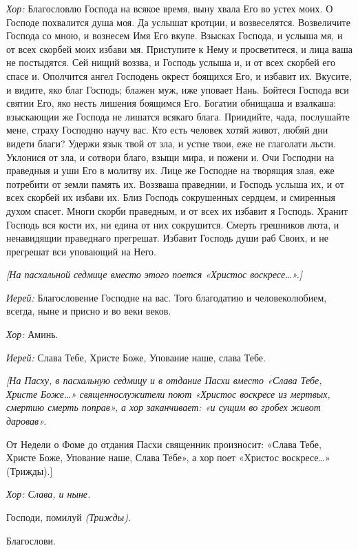 \begin{mymulticols}
{\itshape Хор:} Благословлю Господа на всякое время, выну хвала Его во устех моих. О Господе похвалится душа моя. Да услышат кротции, и возвеселятся. Возвеличите Господа со мною, и вознесем Имя Его вкупе. Взысках Господа, и услыша мя, и от всех скорбей моих избави мя. Приступите к Нему и просветитеся, и лица ваша не постыдятся. Сей нищий воззва, и Господь услыша и, и от всех скорбей его спасе и. Ополчится ангел Господень окрест боящихся Его, и избавит их. Вкусите, и видите, яко благ Господь; блажен муж, иже уповает Нань. Бойтеся Господа вси святии Его, яко несть лишения боящимся Его. Богатии обнищаша и взалкаша: взыскающии же Господа не лишатся всякаго блага. Приидийте, чада, послушайте мене, страху Господню научу вас. Кто есть человек хотяй живот, любяй дни видети благи? Удержи язык твой от зла, и устне твои, еже не глаголати льсти. Уклонися от зла, и сотвори благо, взыщи мира, и пожени и. Очи Господни на праведныя и уши Его в молитву их. Лице же Господне на творящия злая, еже потребити от земли память их. Воззваша праведнии, и Господь услыша их, и от всех скорбей их избави их. Близ Господь сокрушенных сердцем, и смиренныя духом спасет. Многи скорби праведным, и от всех их избавит я Господь. Хранит Господь вся кости их, ни едина от них сокрушится. Смерть грешников люта, и ненавидящии праведнаго прегрешат. Избавит Господь души раб Своих, и не прегрешат вси уповающий на Него.


{\itshape [На пасхальной седмице вместо этого поется «Христос воскресе…».]}


  {\itshape Иерей:} Благословение Господне на вас. Того благодатию и человеколюбием, всегда, ныне и присно и во веки веков.


 {\itshape Хор:} Аминь.
 
 {\itshape Иерей:} Слава Тебе, Христе Боже, Упование наше, слава Тебе.


{\itshape[На Пасху, в пасхальную седмицу и в отдание Пасхи вместо «Слава Тебе, Христе Боже…» священнослужители поют «Христос воскресе из мертвых, смертию смерть поправ», а хор заканчивает: «и сущим во гробех живот даровав». 


    От Недели о Фоме до отдания Пасхи священник произносит: «Слава Тебе, Христе Боже, Упование наше, Слава Тебе», а хор поет «Христос воскресе…» (Трижды).]}
    
{\itshape Хор: Слава, и ныне.}

Господи, помилуй {\itshape (Трижды).}

Благослови. 





\end{mymulticols}
